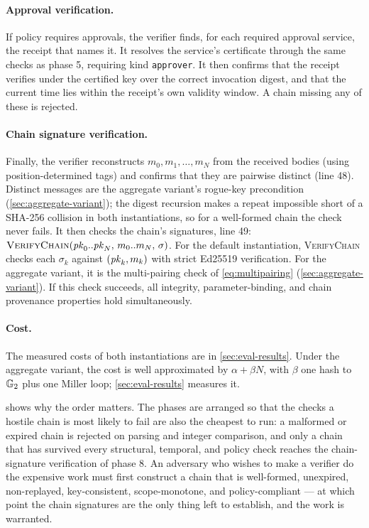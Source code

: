 \documentclass[11pt,a4paper]{article}
\begin{document}
\paragraph{Approval verification.}
If policy requires approvals, the verifier finds, for each required
approval service, the receipt that names it. It resolves the service's
certificate through the same checks as phase 5, requiring kind
\texttt{approver}. It then confirms that the receipt verifies under the
certified key over the correct invocation digest, and that the current
time lies within the receipt's own validity window. A chain missing any
of these is rejected.

\paragraph{Chain signature verification.}
Finally, the verifier reconstructs $m_0, m_1, \ldots, m_N$ from the
received bodies (using position-determined tags) and confirms that they
are pairwise distinct (line 48). Distinct messages are the aggregate
variant's rogue-key precondition (\cref{sec:aggregate-variant}); the
digest recursion makes a repeat impossible short of a SHA-256 collision
in both instantiations, so for a well-formed chain the check never
fails. It then checks the chain's signatures, line 49:
$\Call{VerifyChain}{\pk_0..\pk_N,\, m_0..m_N,\, \sigma}$. For the default
instantiation, \textsc{VerifyChain} checks each $\sigma_k$ against
$(\mathit{pk}_k, m_k)$ with strict Ed25519 verification. For the aggregate
variant, it is the multi-pairing check of \cref{eq:multipairing}
(\cref{sec:aggregate-variant}). If this check succeeds, all integrity,
parameter-binding, and chain provenance properties hold
simultaneously.

\paragraph{Cost.}
The measured costs of both instantiations are in
\cref{sec:eval-results}. Under the aggregate variant, the cost is well
approximated by $\alpha + \beta N$, with $\beta$ one hash to $\mathbb{G}_{2}$
plus one Miller loop; \cref{sec:eval-results} measures it.

 shows why the order matters. The phases are arranged
so that the checks a hostile chain is most likely to fail are also the
cheapest to run: a malformed or expired chain is rejected on parsing and
integer comparison, and only a chain that has survived every
structural, temporal, and policy check reaches the chain-signature
verification of phase 8. An adversary who wishes to make a verifier do
the expensive work must first construct a chain that is well-formed,
unexpired, non-replayed, key-consistent, scope-monotone, and
policy-compliant --- at which point the chain signatures are the only
thing left to establish, and the work is warranted.
\end{document}
